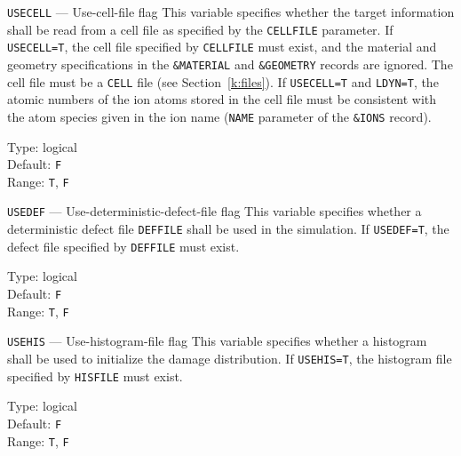 \begin{keydescription}{\texttt{USECELL} --- Use-cell-file flag}
%
  This variable specifies whether the target information shall be read from
  a cell file as specified by the \texttt{CELLFILE} parameter. If
  \texttt{USECELL=T}, the cell file specified by \texttt{CELLFILE} must exist,
  and the material and geometry specifications in the \texttt{\&MATERIAL} and
  \texttt{\&GEOMETRY} records are ignored.  The cell file must be a
  \texttt{CELL} file (see Section~\ref{k:files}). If \texttt{USECELL=T} and
  \texttt{LDYN=T}, the atomic numbers of the ion atoms stored in the cell file
  must be consistent with the atom species given in the ion name (\texttt{NAME}
  parameter of the \texttt{\&IONS} record).

%
  \begin{keytab}
    Type:    \> logical \\
    Default: \> \texttt{F} \\
    Range:   \> \texttt{T}, \texttt{F}
  \end{keytab}
\end{keydescription}

\ifprivate
\begin{keydescription}{\texttt{USEDEF} --- Use-deterministic-defect-file flag}
%
  This variable specifies whether a deterministic defect file \texttt{DEFFILE}
  shall be used in the simulation. If \texttt{USEDEF=T}, the defect file 
  specified by \texttt{DEFFILE} must exist.
%
  \begin{keytab}
    Type:    \> logical \\
    Default: \> \texttt{F} \\
    Range:   \> \texttt{T}, \texttt{F}
  \end{keytab}
\end{keydescription}
\fi

\begin{keydescription}{\texttt{USEHIS} --- Use-histogram-file flag}
%
  This variable specifies whether a histogram shall be used to initialize the 
  damage distribution. If \texttt{USEHIS=T}, the histogram file specified by
  \texttt{HISFILE} must exist. 
%
  \begin{keytab}
    Type:    \> logical \\
    Default: \> \texttt{F} \\
    Range:   \> \texttt{T}, \texttt{F}
  \end{keytab}
\end{keydescription}

